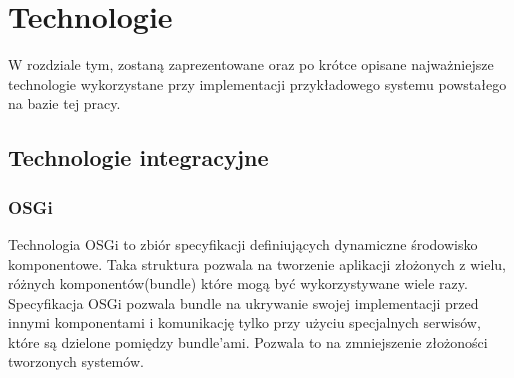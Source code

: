 \ifpdf
    \graphicspath{{3/figures/PNG/}{3/figures/PDF/}{3/figures/}}
\else
    \graphicspath{{3/figures/EPS/}{3/figures/}}
\fi
\chapter{Technologie} %


W rozdziale tym, zostaną zaprezentowane oraz po krótce opisane najważniejsze technologie wykorzystane przy implementacji przykładowego systemu  powstałego na bazie tej pracy.

\section{Technologie integracyjne}
\subsection{OSGi}
Technologia OSGi to zbiór specyfikacji definiujących dynamiczne środowisko komponentowe. Taka struktura pozwala na tworzenie aplikacji złożonych z wielu, różnych komponentów(bundle) które mogą być wykorzystywane wiele razy. Specyfikacja OSGi pozwala bundle na ukrywanie swojej implementacji przed innymi komponentami i komunikację tylko przy użyciu specjalnych serwisów, które są dzielone pomiędzy bundle'ami. Pozwala to na zmniejszenie złożoności tworzonych systemów.

